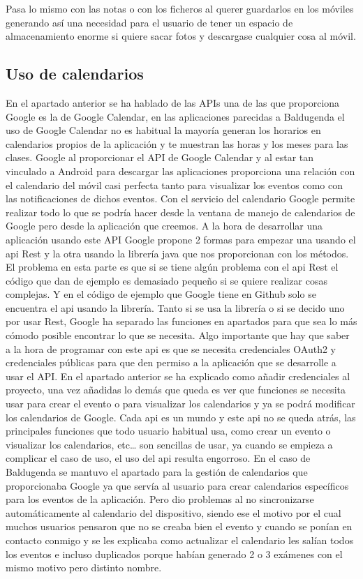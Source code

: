 Pasa lo mismo con las notas o con los ficheros al querer guardarlos en los móviles generando así una necesidad para el usuario de tener un espacio de almacenamiento enorme si quiere sacar fotos y descargase cualquier cosa al móvil.

\subsection{Uso de calendarios}
\label{subsecc:Uso de calendarios}

En el apartado anterior se ha hablado de las APIs  una de las que proporciona Google es la de Google Calendar, en las aplicaciones parecidas a Baldugenda el uso de Google Calendar no es habitual la mayoría generan los horarios en calendarios propios de la aplicación y te muestran las horas y los meses para las clases.
Google al proporcionar el API de Google Calendar y al estar tan vinculado a Android para descargar las aplicaciones proporciona una relación con el calendario del móvil casi perfecta tanto para visualizar los eventos como con las notificaciones de dichos eventos.
Con el servicio del calendario Google permite realizar todo lo que se podría hacer desde la ventana de manejo de calendarios de Google pero desde la aplicación que creemos.
A la hora de desarrollar una aplicación usando este API Google propone 2 formas para empezar una usando el api Rest y la otra usando la librería java que nos proporcionan con los métodos.
El problema en esta parte es que si se tiene algún problema con el api Rest el código que dan de ejemplo es demasiado pequeño si se quiere realizar cosas complejas. Y en el código de ejemplo que Google tiene en Github solo se encuentra el api usando la librería.
Tanto si se usa la librería o si se decido uno por usar Rest, Google ha separado las funciones en apartados para que sea lo más cómodo posible encontrar lo que se necesita.
Algo importante que hay que saber a la hora de programar con este api es que se necesita credenciales OAuth2 y credenciales públicas para que den permiso a la aplicación que se desarrolle a usar el API.
En el apartado anterior se ha explicado como añadir credenciales al proyecto, una vez añadidas lo demás que queda es ver que funciones se necesita usar para crear el evento o para visualizar los calendarios y ya se podrá modificar los calendarios de Google.
Cada api es un mundo y este api no se queda atrás, las principales funciones que todo usuario habitual usa, como crear un evento o visualizar los calendarios, etc… son sencillas de usar, ya cuando se empieza a complicar el caso de uso, el uso del api resulta engorroso.
En el caso de Baldugenda se mantuvo el apartado para la gestión de calendarios que proporcionaba Google ya que servía al usuario para crear calendarios específicos para los eventos de la aplicación. Pero dio problemas al no sincronizarse automáticamente al calendario del dispositivo, siendo ese el motivo por el cual muchos usuarios pensaron que no se creaba bien el evento y cuando se ponían en contacto conmigo y se les explicaba como actualizar el calendario les salían todos los eventos e incluso duplicados porque habían generado 2 o 3 exámenes con el mismo motivo pero distinto nombre.

